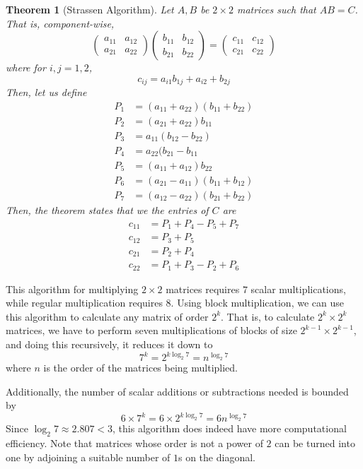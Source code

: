\documentclass{article}
\newtheorem{theorem}{Theorem}[section]
\theoremstyle{remark}
\theoremstyle{definition}
\begin{document}
\begin{theorem}[Strassen Algorithm]
Let $A, B$ be $2 \times 2$ matrices such that $AB = C$. That is, component-wise,
\[\begin{pmatrix}
a_{11} & a_{12} \\ a_{21} & a_{22}
\end{pmatrix} \begin{pmatrix}
b_{11} & b_{12} \\ b_{21} & b_{22}
\end{pmatrix}
 = \begin{pmatrix}
  c_{11} & c_{12} \\ c_{21} & c_{22}
 \end{pmatrix}\]
where for $i, j = 1, 2$, 
\[c_{ij} = a_{i1} b_{1j} + a_{i2} + b_{2j}\]
Then, let us define 
\begin{align*}
    P_1 &= (a_{11} + a_{22}) (b_{11} + b_{22}) \\
    P_2 &= (a_{21} + a_{22}) b_{11} \\
    P_3 &= a_{11} (b_{12} - b_{22}) \\
    P_4 &= a_{22} (b_{21} - b_{11} \\
    P_5 &= (a_{11} + a_{12}) b_{22} \\
    P_6 &= (a_{21} - a_{11}) (b_{11} + b_{12}) \\
    P_7 &= (a_{12} - a_{22}) (b_{21} + b_{22}) 
\end{align*}
Then, the theorem states that we the entries of $C$ are 
\begin{align*}
    c_{11} &= P_1 + P_4 - P_5 + P_7 \\
    c_{12} &= P_3 + P_5 \\
    c_{21} &= P_2 + P_4 \\
    c_{22} &= P_1 + P_3 - P_2 + P_6
\end{align*}
\end{theorem}

This algorithm for multiplying $2\times 2$ matrices requires $7$ scalar multiplications, while regular multiplication requires $8$. Using block multiplication, we can use this algorithm to calculate any matrix of order $2^k$. That is, to calculate $2^k \times 2^k$ matrices, we have to perform seven multiplications of blocks of size $2^{k-1} \times 2^{k-1}$, and doing this recursively, it reduces it down to 
\[7^k = 2^{k \log_2{7}} = n^{\log_2{7}}\]
where $n$ is the order of the matrices being multiplied. 

Additionally, the number of scalar additions or subtractions needed is bounded by 
\[6 \times 7^k = 6 \times 2^{k \log_2{7}} = 6 n^{\log_2{7}}\]
Since $\log_2{7} \approx 2.807 < 3$, this algorithm does indeed have more computational efficiency. Note that matrices whose order is not a power of $2$ can be turned into one by adjoining a suitable number of $1$s on the diagonal. 
\end{document}

